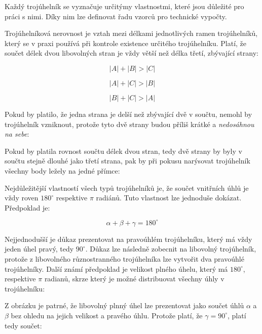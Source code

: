 Každý trojúhelník se vyznačuje určitýmy vlastnostmi, které jsou důležité pro práci s nimi. Díky nim lze definovat řadu vzorců pro technické vypočty.


Trojúhelníková nerovnost je vztah mezi délkami jednotlivých ramen trojúhelníků, který se v praxi používá při kontrole existence určitého trojúhelníku. Platí, že součet délek dvou libovolných stran je vždy větší než délka třetí, zbývající strany:

$$ |A| + |B| > |C| $$

$$ |A| + |C| > |B| $$

$$ |B| + |C| > |A| $$

Pokud by platilo, že jedna strana je delší než zbývající dvě v součtu, nemohl by trojúhelník vzniknout, protože tyto dvě strany budou příliš krátké a {\it nedosáhnou na sebe}:

\vskip 4mm
\centerline{}
\vskip 4mm

Pokud by platila rovnost součtu délek dvou stran, tedy dvě strany by byly v součtu stejně dlouhé jako třetí strana, pak by při pokusu narýsovat trojúhelník všechny body ležely na jedné přímce: 

\vskip 4mm
\centerline{}
\vskip 4mm




Nejdůležitější vlastností všech typů trojúhelníků je, že součet vnitřních úhlů je vždy roven $180^\circ$ respektive $\pi$ radiánů. Tuto vlastnost lze jednoduše dokázat. Předpoklad je:

$$ \alpha + \beta + \gamma = 180^\circ $$

Nejjednodušší je důkaz prezentovat na pravoúhlém trojúhelníku, který má vždy jeden úhel pravý, tedy $90^\circ$. Důkaz lze následně zobecnit na libovolný trojúhelník, protože z libovolného různostranného trojúhelníka lze vytvořit dva pravoúhlé trojúhelníky. Další známí předpoklad je velikost plného úhelu, který má $180^\circ$, respektive $\pi$ radianů, skrze který je možné distribuovat všechny úhly v trojúhelníku:

\vskip 4mm
\centerline{}
\vskip 4mm


Z obrázku je patrné, že libovolný plnný úhel lze prezentovat jako součet úhlů $\alpha$ a $\beta$ bez ohledu na jejich velikost a pravého úhlu. Protože platí, že $\gamma = 90^\circ$, platí tedy součet:

